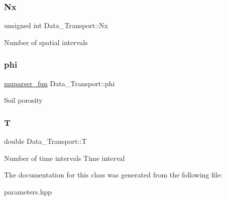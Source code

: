 \subsubsection{\texorpdfstring{Nx}{Nx}}
{\footnotesize\ttfamily unsigned int Data\+\_\+\+Transport\+::\+Nx}

Number of spatial intervals \mbox{\label{classData__Transport_af5032faf024d666c17b41cda75cabf2b}} 
\subsubsection{\texorpdfstring{phi}{phi}}
{\footnotesize\ttfamily \hyperlink{classmuparser__fun}{muparser\+\_\+fun} Data\+\_\+\+Transport\+::phi}

Soil porosity \mbox{\label{classData__Transport_abf3c76b02af6f7a2ca96fa6299d00fec}} 
\subsubsection{\texorpdfstring{T}{T}}
{\footnotesize\ttfamily double Data\+\_\+\+Transport\+::T}

Number of time intervals Time interval 

The documentation for this class was generated from the following file\+:\begin{DoxyCompactItemize}
\item 
parameters.\+hpp\end{DoxyCompactItemize}
